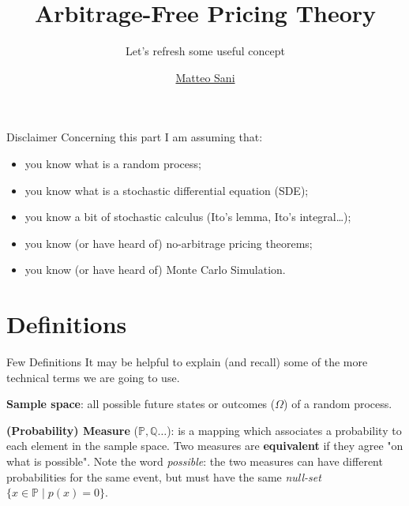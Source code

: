 \documentclass{beamer}
\title{Arbitrage-Free Pricing Theory}
\subtitle{Let's refresh some useful concept}
\author{\href{mailto:matteo.sani@unisi.it}{Matteo Sani}}
\begin{document}
	\begin{frame}[plain]
		\maketitle
	\end{frame}        

\begin{frame}{}
\begin{block}{Disclaimer}	
Concerning this part I am assuming that:
\begin{itemize}
\item you know what is a random process;
\item you know what is a stochastic differential equation (SDE);
\item you know a bit of stochastic calculus (Ito's lemma, Ito's integral\ldots);
\item you know (or have heard of) no-arbitrage pricing theorems;
\item you know (or have heard of) Monte Carlo Simulation.
\end{itemize}
\end{block}
\end{frame}	

\section{Definitions}
\begin{frame}{Few Definitions}
		It may be helpful to explain (and recall) some of the more technical terms we are going to use.\newline
		
		\textbf{Sample space}: all possible future states or outcomes ($\Omega$) of a random process.\newline
		
		\textbf{(Probability) Measure} ($\mathbb{P}, \mathbb{Q}\ldots$): is a mapping which associates a probability to each element in the sample space. Two measures are \textbf{equivalent} if they agree "on what is possible". Note the word \emph{possible}: the two measures can have different probabilities for the same event, but must have the same \emph{null-set} $\{x\in {\mathbb{P}}\mid p (x)=0\}$. 
	\end{frame}
\end{document}
